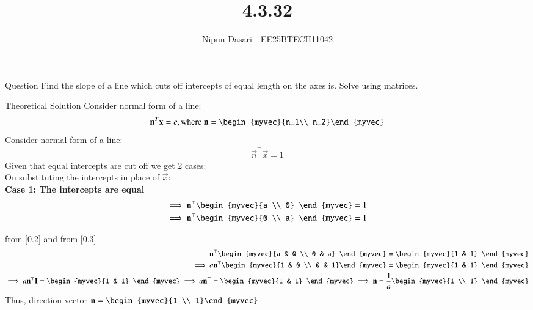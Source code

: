 \documentclass{beamer}
\title %
{4.3.32}
\author %
{Nipun Dasari - EE25BTECH11042}
\begin{document}
	
	\frame{\titlepage}
	\begin{frame}{Question}
		Find the slope of a line which cuts off intercepts of equal length on the axes is. Solve using matrices. \\
	\end{frame}
	
	
	\begin{frame}{Theoretical Solution}
	Consider normal form of a line:
	\begin{align}
		\vec{n}^T\vec{x} = c, \text{where } \vec{n} = \begin{myvec}{n_1\\ n_2}\end{myvec}
	\end{align}
Consider normal form of a line:
\begin{align}
	\vec{n}^\top\vec{x} = 1
\end{align}
Given that equal intercepts are cut off we get 2 cases:\\
On substituting the intercepts in place of $\vec{x}$: \\
\textbf{Case 1: The intercepts are equal }
\begin{align}
	\implies  \vec{n}^\top\begin{myvec}{a \\ 0} \end{myvec} = 1  \label{0.2}\\
	\implies \vec{n}^\top\begin{myvec}{0 \\ a} \end{myvec} = 1  \label{0.3} \\
\end{align}

from \eqref{0.2} and from \eqref{0.3}
\begin{align}
	\vec{n}^\top\begin{myvec}{a & 0 \\ 0 & a} \end{myvec} = \begin{myvec}{1 & 1} \end{myvec} \\
	\implies a\vec{n}^\top\begin{myvec}{1 & 0 \\ 0 & 1}\end{myvec} = \begin{myvec}{1 & 1} \end{myvec}\\
	\implies a\vec{n}^\top\vec{I} = \begin{myvec}{1 & 1} \end{myvec}
	\implies a\vec{n}^\top = \begin{myvec}{1 & 1} \end{myvec}
	\implies \vec{n} = \frac{1}{a}\begin{myvec}{1 \\ 1} \end{myvec}
\end{align}
Thus, direction vector $\vec{n} = \begin{myvec}{1 \\ 1}\end{myvec}$
		
	\end{frame}
\end{document}
